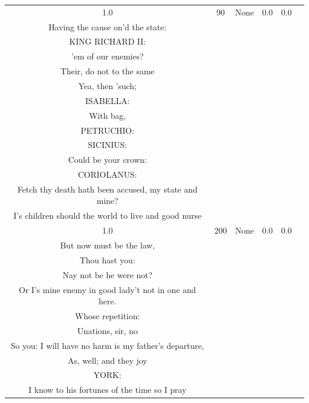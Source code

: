 \documentclass[11pt]{book}
\begin{document}
\begin{longtable}{ccccc >{\raggedright\arraybackslash}p{8cm}}
    1.0 & 90 & None & 0.0 & 0.0 &
    \begin{tcolorbox}[breakable, enhanced jigsaw, frame hidden, colback=white, boxrule=0pt]
    KING RICHARD:\\
    Having the cause on'd the state:\\
    KING RICHARD II:\\
    'em of our enemies?\\
    Their, do not to the same\\
    Yea, then 'such;\\
    ISABELLA:\\
    With bag,\\
    PETRUCHIO:\\
    SICINIUS:\\
    Could be your crown:\\
    CORIOLANUS:\\
    Fetch thy death hath been accused, my state and mine?\\
    I's children should the world to live and good nurse
    \end{tcolorbox} \\
    
    1.0 & 200 & None & 0.0 & 0.0 &
    \begin{tcolorbox}[breakable, enhanced jigsaw, frame hidden, colback=white, boxrule=0pt]
    KING RICHARD:\\
    But now must be the law,\\
    Thou hast you:\\
    Nay not be he were not?\\
    Or I's mine enemy in good lady't not in one and here.\\
    Whose repetition:\\
    Unations, sir, no\\
    So you: I will have no harm is my father's departure,\\
    As, well; and they joy\\
    YORK:\\
    I know to his fortunes of the time so I pray
    \end{tcolorbox} \\
    

\end{longtable}
\end{document}

